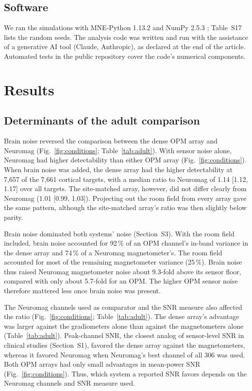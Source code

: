 \documentclass[preprint,12pt,authoryear,a4paper]{elsarticle}
\begin{document}
\subsection{Software}\label{sec:software}

We ran the simulations with MNE-Python 1.13.2 \citep{gramfort2013} and NumPy 2.5.3 \citep{harris2020}; Table~S17 lists the random seeds. The analysis code was written and run with the assistance of a generative AI tool (Claude, Anthropic), as declared at the end of the article. Automated tests in the public repository cover the code's numerical components.

\FloatBarrier


\section{Results}\label{sec:results}

\subsection{Determinants of the adult comparison}\label{sec:res-adult}

Brain noise reversed the comparison between the dense OPM array and Neuromag (Fig.~\ref{fig:conditions}; Table~\ref{tab:adult}). With sensor noise alone, Neuromag had higher detectability than either OPM array (Fig.~\ref{fig:conditions}). When brain noise was added, the dense array had the higher detectability at 7,657 of the 7,661 cortical targets, with a median ratio to Neuromag of 1.14 [1.12, 1.17] over all targets. The site-matched array, however, did not differ clearly from Neuromag (1.01 [0.99, 1.03]). Projecting out the room field from every array gave the same pattern, although the site-matched array's ratio was then slightly below parity.

Brain noise dominated both systems' noise (Section~S3). With the room field included, brain noise accounted for 92\,\% of an OPM channel's in-band variance in the dense array and 74\,\% of a Neuromag magnetometer's. The room field accounted for most of the remaining magnetometer variance (25\,\%). Brain noise thus raised Neuromag magnetometer noise about 9.3-fold above its sensor floor, compared with only about 5.7-fold for an OPM. The higher OPM sensor noise therefore mattered less once brain noise was present.

The Neuromag channels used as comparator and the SNR measure also affected the ratio (Fig.~\ref{fig:conditions}; Table~\ref{tab:adult}). The dense array's advantage was larger against the gradiometers alone than against the magnetometers alone (Table~\ref{tab:adult}). Peak-channel SNR, the closest analog of sensor-level SNR in clinical studies (Section~S1), favored the dense array against the magnetometers, whereas it favored Neuromag when Neuromag's best channel of all 306 was used. Both OPM arrays had only small advantages in mean-power SNR (Fig.~\ref{fig:conditions}). Thus, which system a reported SNR favors depends on the Neuromag channels and SNR measure used.
\end{document}
